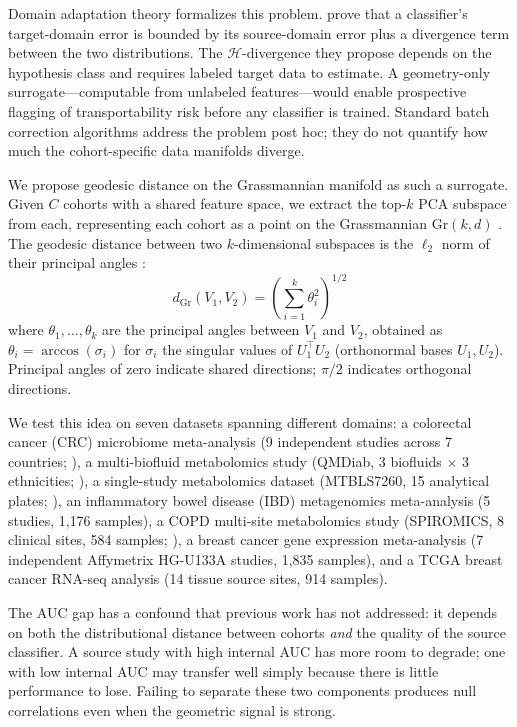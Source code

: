 \documentclass[11pt]{article}
\begin{document}
Domain adaptation theory formalizes this problem. \citet{bendavid2010theory} prove that a classifier's target-domain error is bounded by its source-domain error plus a divergence term between the two distributions. The $\mathcal{H}$-divergence they propose depends on the hypothesis class and requires labeled target data to estimate. A geometry-only surrogate---computable from unlabeled features---would enable prospective flagging of transportability risk before any classifier is trained. Standard batch correction algorithms \citep{johnson2007adjusting} address the problem post hoc; they do not quantify how much the cohort-specific data manifolds diverge.

We propose geodesic distance on the Grassmannian manifold as such a surrogate. Given $C$ cohorts with a shared feature space, we extract the top-$k$ PCA subspace from each, representing each cohort as a point on the Grassmannian $\mathrm{Gr}(k, d)$ \citep{edelman1998geometry}. The geodesic distance between two $k$-dimensional subspaces is the $\ell_2$ norm of their principal angles \citep{bjorck1973numerical, ye2016schubert}:
\begin{equation}
d_{\mathrm{Gr}}(V_1, V_2) = \left(\sum_{i=1}^{k} \theta_i^2\right)^{1/2}
\end{equation}
where $\theta_1, \ldots, \theta_k$ are the principal angles between $V_1$ and $V_2$, obtained as $\theta_i = \arccos(\sigma_i)$ for $\sigma_i$ the singular values of $U_1^\top U_2$ (orthonormal bases $U_1, U_2$). Principal angles of zero indicate shared directions; $\pi/2$ indicates orthogonal directions.

We test this idea on seven datasets spanning different domains: a colorectal cancer (CRC) microbiome meta-analysis (9 independent studies across 7 countries; \citealp{wirbel2019meta}), a multi-biofluid metabolomics study (QMDiab, 3 biofluids $\times$ 3 ethnicities; \citealp{yousri2015metabolic}), a single-study metabolomics dataset (MTBLS7260, 15 analytical plates; \citealp{leonletelier2024contributions}), an inflammatory bowel disease (IBD) metagenomics meta-analysis (5 studies, 1{,}176 samples), a COPD multi-site metabolomics study (SPIROMICS, 8 clinical sites, 584 samples; \citealp{bowler2017spiromics}), a breast cancer gene expression meta-analysis (7 independent Affymetrix HG-U133A studies, 1{,}835 samples), and a TCGA breast cancer RNA-seq analysis (14 tissue source sites, 914 samples).

The AUC gap has a confound that previous work has not addressed: it depends on both the distributional distance between cohorts \emph{and} the quality of the source classifier. A source study with high internal AUC has more room to degrade; one with low internal AUC may transfer well simply because there is little performance to lose. Failing to separate these two components produces null correlations even when the geometric signal is strong.
\end{document}
